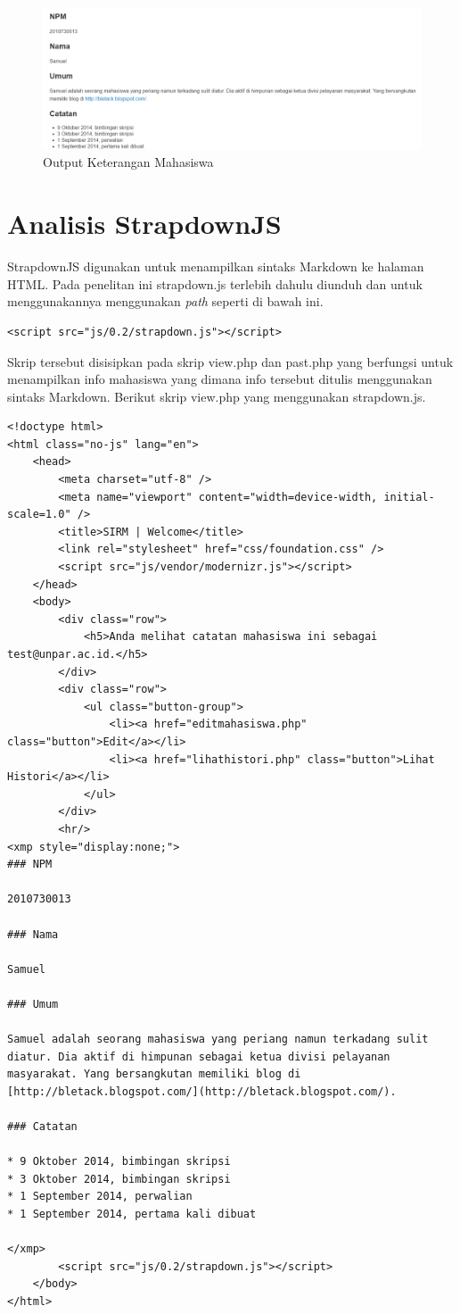 \begin{figure}[pt]
\centering
\includegraphics[scale=0.45]{Gambar/overall.png}
\caption[Output Keterangan Mahasiswa]{Output Keterangan Mahasiswa} 
\label{fig:overall}
\end{figure}

\section{Analisis StrapdownJS}
\label{sec:analisisStrapdownJS}
StrapdownJS digunakan untuk menampilkan sintaks Markdown ke halaman HTML. Pada
penelitan ini strapdown.js terlebih dahulu diunduh dan untuk menggunakannya
menggunakan {\it path} seperti di bawah ini.
\begin{lstlisting}[basicstyle=\footnotesize]
<script src="js/0.2/strapdown.js"></script>
\end{lstlisting}
Skrip tersebut disisipkan pada skrip view.php dan past.php yang berfungsi untuk
menampilkan info mahasiswa yang dimana info tersebut ditulis menggunakan sintaks
Markdown. Berikut skrip view.php yang menggunakan strapdown.js.
\begin{lstlisting}[basicstyle=\footnotesize]
<!doctype html>
<html class="no-js" lang="en">
	<head>
		<meta charset="utf-8" />
		<meta name="viewport" content="width=device-width, initial-scale=1.0" />
		<title>SIRM | Welcome</title>
		<link rel="stylesheet" href="css/foundation.css" />
		<script src="js/vendor/modernizr.js"></script>
	</head>
	<body>
		<div class="row">
			<h5>Anda melihat catatan mahasiswa ini sebagai test@unpar.ac.id.</h5>
		</div>
		<div class="row">
			<ul class="button-group">
				<li><a href="editmahasiswa.php" class="button">Edit</a></li>
				<li><a href="lihathistori.php" class="button">Lihat Histori</a></li>
			</ul>
		</div>
		<hr/>
<xmp style="display:none;">
### NPM

2010730013

### Nama

Samuel
			
### Umum
			
Samuel adalah seorang mahasiswa yang periang namun terkadang sulit diatur. Dia aktif di himpunan sebagai ketua divisi pelayanan masyarakat. Yang bersangkutan memiliki blog di [http://bletack.blogspot.com/](http://bletack.blogspot.com/).
			
### Catatan
			
* 9 Oktober 2014, bimbingan skripsi
* 3 Oktober 2014, bimbingan skripsi
* 1 September 2014, perwalian
* 1 September 2014, pertama kali dibuat

</xmp>
		<script src="js/0.2/strapdown.js"></script>
	</body>
</html>
\end{lstlisting}
